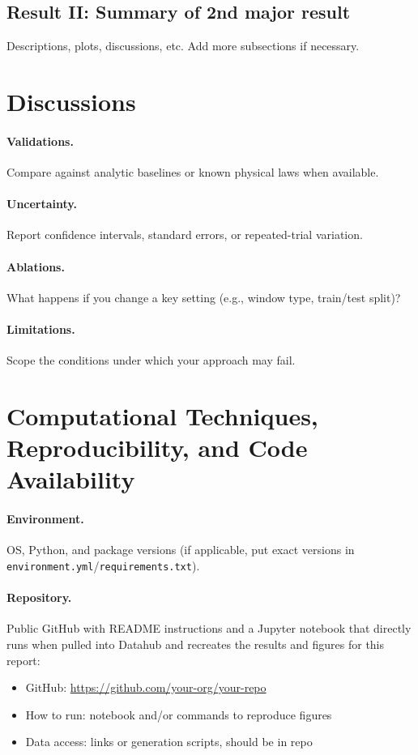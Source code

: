 \documentclass[reprint, superscriptaddress, aps]{revtex4-2}
\begin{document}
\subsection{Result II: Summary of 2nd major result}
Descriptions, plots, discussions, etc. Add more subsections if necessary. 

\section{Discussions}

\paragraph*{Validations.} Compare against analytic baselines or known physical laws when available.

\paragraph*{Uncertainty.} Report confidence intervals, standard errors, or repeated-trial variation.

\paragraph*{Ablations.} What happens if you change a key setting (e.g., window type, train/test split)?

\paragraph*{Limitations.} Scope the conditions under which your approach may fail.


\section{Computational Techniques, Reproducibility, and Code Availability}

\paragraph*{Environment.} OS, Python, and package versions (if applicable, put exact versions in \texttt{environment.yml}/\texttt{requirements.txt}).

\paragraph*{Repository.} Public GitHub with README instructions and a Jupyter notebook that directly runs when pulled into Datahub and recreates the results and figures for this report:
\begin{itemize}
  \item GitHub: \href{https://github.com/your-org/your-repo}{https://github.com/your-org/your-repo}
  \item How to run: notebook and/or commands to reproduce figures
  \item Data access: links or generation scripts, should be in repo
\end{itemize}
\end{document}
